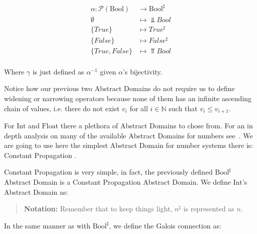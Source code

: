 \[
\begin{array}{rl}
  \alpha \colon \mathcal{P}(\text{Bool}) &\to \text{Bool}^\sharp \\
  \emptyset       & \mapsto \Bot{Bool} \\
  \{True\}        & \mapsto True^\sharp \\
  \{False\}       & \mapsto False^\sharp \\
  \{True, False\} & \mapsto \Top{Bool} \\
\end{array}
\]

Where \(\gamma{}\) is just defined as \(\alpha^{-1}\) given
\(\alpha{}\)'s bijectivity.

Notice how our previous two Abstract Domains do not require us to define widening or
narrowing operators because none of them has an infinite ascending chain of values, i.e.
there do not exist \(v_i\) for all \(i \in \mathbb{N}\) such that \(v_i \le v_{i+1}\).

For \(\text{Int}\) and \(\text{Float}\) there a plethora of Abstract Domains to chose from.
For an in depth analysis on many of the available Abstract Domains for numbers
see~\textcite{mine_weakly_2004}. We are going to use here the simplest Abstract Domain for
number systems there is: Constant Propagation \autocite{kildall_unified_1973}.

Constant Propagation is very simple, in fact, the previously defined
\(\text{Bool}^\sharp\) Abstract Domain is a Constant Propagation Abstract Domain. We
define \(\text{Int}\)'s Abstract Domain as:

\begin{center}

\end{center}


\begin{quote}
\textbf{Notation:} Remember that to keep things light, \(n^\sharp\) is represented as \(n\).
\end{quote}

In the same manner as with \(\text{Bool}^\sharp\), we define the Galois
connection as:

